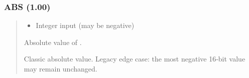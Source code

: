 \documentclass[letterpaper,10pt,english]{sphinxmanual}
\begin{document}
\subsubsection{ABS (1.00)}
\label{\detokenize{ppl:abs-1-00}}\begin{quote}

\sphinxAtStartPar
{}
\begin{description}
\begin{itemize}
\item {} 
\sphinxAtStartPar
{} \textendash{} Integer input (may be negative)

\end{itemize}

\sphinxAtStartPar
Absolute value of .

\sphinxAtStartPar
Classic absolute value. Legacy edge case: the most negative 16‑bit value may remain unchanged.

\end{description}

\sphinxAtStartPar
{}
\begin{quote}

\begin{sphinxVerbatim}[commandchars=\\\{\}]
    
\end{sphinxVerbatim}
\end{quote}
\end{quote}
\end{document}
